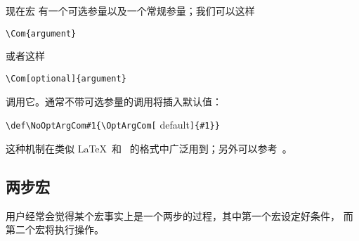 \documentclass{book}
\begin{document}
现在宏  有一个可选参量以及一个常规参量；我们可以这样
\begin{verbatim}
\Com{argument}
\end{verbatim}
或者这样
\begin{verbatim}
\Com[optional]{argument}
\end{verbatim}
调用它。通常不带可选参量的调用将插入默认值：
\begin{disp}\verb>\def\NoOptArgCom#1{\OptArgCom[>%
{\italic default\/}\verb>]{#1}}>\end{disp}
这种机制在类似 \LaTeX\ 和 \LamsTeX\ 的格式中广泛用到；另外可以参考~\cite{svb:future}。



\subsection{两步宏}

用户经常会觉得某个宏事实上是一个两步的过程，其中第一个宏设定好条件，
而第二个宏将执行操作。
\end{document}

